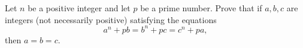 Let $n$ be a positive integer and let $p$ be a prime number. Prove that if $a, b, c$ are integers (not necessarily positive) satisfying the equations
\[
a^{n} + pb = b^{n} + pc = c^{n} + pa,
\]
then $a = b = c$.
